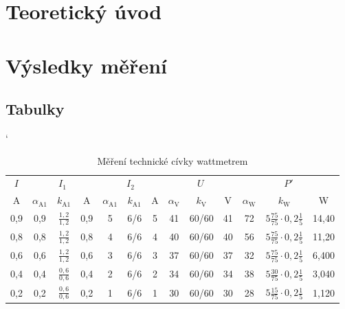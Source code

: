 \documentclass[a4paper, czech]{article}
\begin{document}
\section{Teoretický úvod}

\section{Výsledky měření}

\subsection{Tabulky}

\begin{table}[H]
    \catcode`
    \centering
    \caption{Měření technické cívky wattmetrem}
    \renewcommand{\arraystretch}{1.25}
    \begin{tabular}{ccccccccccccc}
        \toprule
        $I$   & \multicolumn{3}{c}{$I_1$} & \multicolumn{3}{c}{$I_2$} & \multicolumn{3}{c}{$U$} & \multicolumn{3}{c}{$P'$}           \\
        \cmidrule(rl){1-1}
        \cmidrule(rl){2-4}
        \cmidrule(rl){5-7}
        \cmidrule(rl){8-10}
        \cmidrule(rl){11-13}
        A   & $\alpha_\text{A1}$  & $k_\text{A1}$      & A    & $\alpha_\text{A1}$  & $k_\text{A1}$    & A    & $\alpha_\text{V}$  & $k_\text{V}$      & V    & $\alpha_\text{W}$  & $k_\text{W}$                  & W     \\
        \midrule
        0,9 & 0,9  & $\frac{1,2}{1,2}$  & 0,9  & 5      & 6/6    & 5    & 41   & 60/60   & 41   & 72 & $5 \frac{75}{75} \cdot 0,2 \frac{1}{5}$ & 14,40 \\
        0,8 & 0,8  & $\frac{1,2}{1,2}$  & 0,8  & 4      & 6/6    & 4    & 40   & 60/60   & 40   & 56 & $5 \frac{75}{75} \cdot 0,2 \frac{1}{5}$ & 11,20 \\
        0,6 & 0,6  & $\frac{1,2}{1,2}$  & 0,6  & 3      & 6/6    & 3    & 37   & 60/60   & 37   & 32 & $5 \frac{75}{75} \cdot 0,2 \frac{1}{5}$ & 6,400 \\
        0,4 & 0,4  & $\frac{0,6}{0,6}$  & 0,4  & 2      & 6/6    & 2    & 34   & 60/60   & 34   & 38 & $5 \frac{30}{75} \cdot 0,2 \frac{1}{5}$ & 3,040 \\
        0,2 & 0,2  & $\frac{0,6}{0,6}$  & 0,2  & 1      & 6/6    & 1    & 30   & 60/60   & 30   & 28 & $5 \frac{15}{75} \cdot 0,2 \frac{1}{5}$ & 1,120 \\
        \bottomrule
    \end{tabular}
\end{table}
\end{document}

